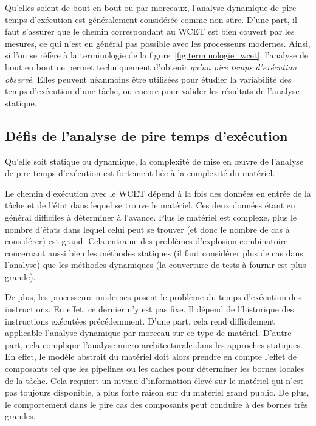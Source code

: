 Qu'elles soient de bout en bout ou par morceaux, l'analyse dynamique de pire temps d'exécution est généralement considérée comme non sûre.
D'une part, il faut s'assurer que le chemin correspondant au WCET est bien couvert par les mesures, ce qui n'est en général pas possible avec les processeurs modernes.
Ainsi, si l'on se réfère à la terminologie de la figure~\ref{fig:terminologie_wcet}, l'analyse de bout en bout ne permet techniquement d'obtenir \emph{qu'un pire temps d'exécution observé}.
Elles peuvent néanmoins être utilisées pour étudier la variabilité des temps d'exécution d'une tâche, ou encore pour valider les résultats de l'analyse statique.

\subsection{Défis de l'analyse de pire temps d'exécution}

Qu'elle soit statique ou dynamique, la complexité de mise en œuvre de l'analyse de pire temps d'exécution est fortement liée à la complexité du matériel.

Le chemin d'exécution avec le WCET dépend à la fois des données en entrée de la tâche et de l'état dans lequel se trouve le matériel.
Ces deux données étant en général difficiles à déterminer à l'avance.
Plus le matériel est complexe, plus le nombre d'états dans lequel celui peut se trouver (et donc le nombre de cas à considérer) est grand.
Cela entraine des problèmes d'explosion combinatoire concernant aussi bien les méthodes statiques (il faut considérer plus de cas dans l'analyse) que les méthodes dynamiques (la couverture de tests à fournir est plus grande).

De plus, les processeurs modernes posent le problème du temps d'exécution des instructions.
En effet, ce dernier n'y est pas fixe.
Il dépend de l'historique des instructions exécutées précédemment.
D'une part, cela rend difficilement applicable l'analyse dynamique par morceau sur ce type de matériel.
D'autre part, cela complique l'analyse micro architecturale dans les approches statiques.
En effet, le modèle abstrait du matériel doit alors prendre en compte l'effet de composants tel que les pipelines ou les caches pour déterminer les bornes locales de la tâche.
Cela requiert un niveau d'information élevé sur le matériel qui n'est pas toujours disponible, à plus forte raison sur du matériel grand public.
De plus, le comportement dans le pire cas des composants peut conduire à des bornes très grandes.


